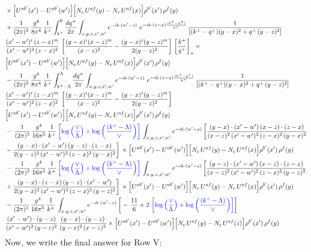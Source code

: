 \documentclass[9pt]{article}
\numberwithin{equation}{section}
\begin{document}
\begin{align}
&\times\Big[U^{ab'}(x')-U^{ab'}(w')\Big]\Big[N_{c}\,U^{af}(y)-N_{c}\,U^{af}(x)\Big]\rho^{b'}(x')\,\rho^{f}(y)\notag \\ & + \frac{1}{(2\pi)^{3}}\,\frac{g^{4}}{8\pi^{4}}\,\frac{1}{k^{+}}\int_{k^{+}}^{0}\frac{dq^{+}}{2\pi}\int_{x,y,z,x',w'}e^{-ik\cdot(w'-z)}\ e^{-ik\cdot(z-x)\frac{(k^{+}-q^{+})}{k^{+}}}\,\frac{1}{\left[(k^{+}-q^{+})(y-x)^{2}+q^{+}\,(y-z)^{2}\right]}\notag \\ & \frac{(x'-w')^{i}\,(z-x)^{m}}{(x'-w')^{2}\,(z-x)^{2}}\,\left[\frac{(y-x)^{i}(x-z)^{m}}{(x-z)^{2}}-\frac{(y-x)^{i}(y-z)^{m}}{2(y-z)^{2}}\right]\,\left[\frac{k^{+}}{q^{+}}\right]_{+}\times\notag \\ & \Big[U^{ab'}(x')-U^{ab'}(w')\Big]\Big[N_{c}\,U^{af}(y)-N_{c}\,U^{af}(x)\Big]\rho^{b'}(x')\,\rho^{f}(y)\notag \\ & - \frac{1}{(2\pi)^{3}}\,\frac{g^{4}}{8\pi^{4}}\,\frac{1}{k^{+}}\int_{k^{+}-\Lambda}^{\Lambda}\frac{dq^{+}}{2\pi}\int_{x,y,z,x',w'}e^{-ik\cdot(w'-z)}\ e^{-ik\cdot(z-x)\frac{(k^{+}-q^{+})}{k^{+}}}\,\frac{1}{\left[(k^{+}-q^{+})(y-x)^{2}+q^{+}\,(y-z)^{2}\right]}\notag \\ & \frac{(x'-w')^{i}\,(z-x)^{m}}{(x'-w')^{2}\,(z-x)^{2}}\,\left[\frac{(y-x)^{i}(x-z)^{m}}{(x-z)^{2}}-\frac{(y-x)^{i}(y-z)^{m}}{2(y-z)^{2}}\right]\notag \\ & \Big[U^{ab'}(x')-U^{ab'}(w')\Big]\Big[N_{c}\,U^{af}(y)-N_{c}\,U^{af}(x)\Big]\rho^{b'}(x')\,\rho^{f}(y)\notag \\ & -\, \frac{1}{(2\pi)^{3}}\,\frac{g^{4}}{16\pi^{5}}\,\frac{1}{k^{+}}\,{\color{blue}\left[\log{\left(\frac{\vee}{\Lambda}\right)} + \log{\left(\frac{(k^{+}-\Lambda)}{\vee}\right)}\right]}\,\int_{x,y,z,x',w'}e^{-ik\cdot(w'-x)}\, \bigg[\frac{(y-x)\cdot (x'-w')\,(x-z)\cdot (z-x)}{(x-z)^{2}\,(x'-w')^{2}\,(z-x)^{2}\,(y-x)^{2}}\notag \\ & -\frac{(y-x)\cdot (x'-w')\,(y-z)\cdot (z-x)}{2(y-z)^{2}\,(x'-w')^{2}\,(z-x)^{2}\,(y-x)^{2}}\bigg]\,\times \Big[U^{ab'}(x')-U^{ab'}(w')\Big]\Big[N_{c}\,U^{af}(y)-N_{c}\,U^{af}(x)\Big]\rho^{b'}(x')\,\rho^{f}(y)\notag \\ & -\, \frac{1}{(2\pi)^{3}}\,\frac{g^{4}}{16\pi^{5}}\,\frac{1}{k^{+}}\,{\color{blue}\left[\log{\left(\frac{\vee}{\Lambda}\right)} + \log{\left(\frac{(k^{+}-\Lambda)}{\vee}\right)}\right]}\,\int_{x,y,z,x',w'}e^{-ik\cdot(w'-z)}\,\bigg[\frac{(y-z)\cdot (x'-w')\,(x-z)\cdot (z-x)}{(x-z)^{2}\,(x'-w')^{2}\,(z-x)^{2}\,(y-z)^{2}}\notag \\ & +\frac{(y-x)\cdot (z-x)\,(y-z)\cdot (x'-w')}{2(y-x)^{2}\,(x'-w')^{2}\,(z-x)^{2}\,(y-z)^{2}}\bigg]\,\times \Big[U^{ab'}(x')-U^{ab'}(w')\Big]\Big[N_{c}\,U^{af}(y)-N_{c}\,U^{af}(x)\Big]\rho^{b'}(x')\,\rho^{f}(y)\notag \\ & - \frac{1}{(2\pi)^{3}}\,\frac{g^{4}}{16\pi^{5}}\,\frac{1}{k^{+}}\,\int_{x,y,z,x',w'}e^{-ik\cdot(w'-z)}\,\bigg[-\,\frac{11}{6}+{\color{blue}2\,\left[\log{\left(\frac{\vee}{\Lambda}\right)} + \log{\left(\frac{(k^{+}-\Lambda)}{\vee}\right)}\right]}\bigg]\notag \\ & \frac{(x'-w')\cdot(y-z)}{(x'-w')^{2}\,(y-z)^{2}}\,\frac{(y-x)\cdot(y-z)}{(y-x)^{2}\,(x-z)^{2}}\times\Big[U^{ab'}(x')-U^{ab'}(w')\Big]\Big[N_{c}\,U^{af}(y)-N_{c}\,U^{af}(z)\Big]\rho^{b'}(x')\,\rho^{f}(y)
\end{align}
Now, we write the final answer for Row V:
\end{document}

